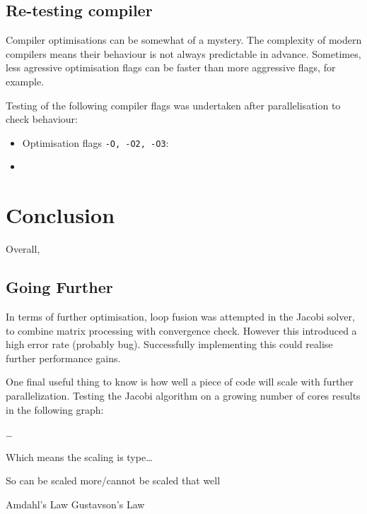 \documentclass{article}
\begin{document}
\subsection{Re-testing compiler}
Compiler optimisations can be somewhat of a mystery. The complexity of
modern compilers means their behaviour is not always predictable in
advance. Sometimes, less agressive optimisation flags can be faster
than more aggressive flags, for example.

Testing of the following compiler flags was undertaken after
parallelisation to check behaviour:

\begin{itemize}
\item Optimisation flags \texttt{-O, -O2, -O3}: 
\item 
\end{itemize}

\section{Conclusion}
Overall,

\subsection{Going Further}
In terms of further optimisation, loop fusion was attempted in the
Jacobi solver, to combine matrix processing with convergence
check. However this introduced a high error rate (probably
bug). Successfully implementing this could realise further performance
gains.

One final useful thing to know is how well a piece of code will scale
with further parallelization. Testing the Jacobi algorithm on a
growing number of cores results in the following graph:

\ldots

Which means the scaling is type\ldots

So can be scaled more/cannot be scaled that well

Amdahl's Law Gustavson's Law
\end{document}
